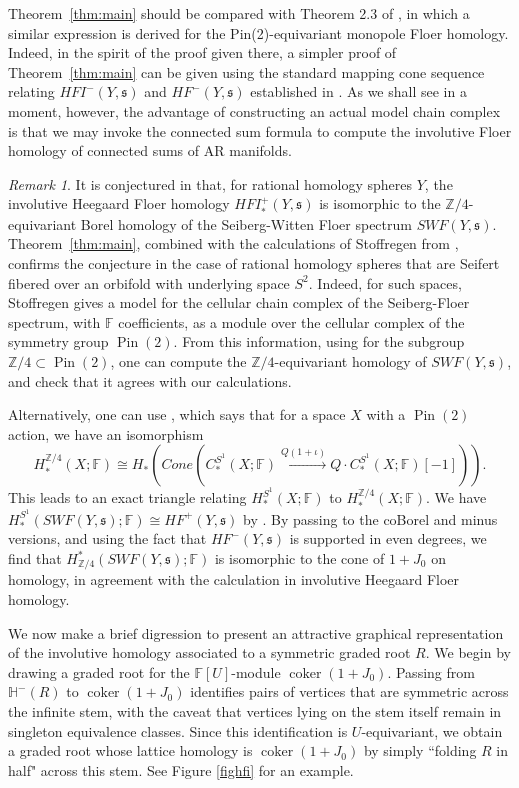 \documentclass[11 pt]{amsart}
\theoremstyle{remark}
\newtheorem {remark}[theorem]{Remark}
\DeclareMathOperator{\coker}{coker}
\newcommand\Z{\mathbb{Z}}
\def\s{\mathfrak s}
\def\ff {{\mathbb{F}}}
\def\ccdot {\! \cdot \!}
\def\pin{\operatorname{Pin}(2)}
\def\Cone{\mathit{Cone}}
\def\He{\mathbb{H}}
\def\HF {\mathit{HF}}
\newcommand \HFm {\HF^-}
\def\HFI {\mathit{HFI}}
\newcommand \HFIm {\HFI^-}
\def\inv{\iota}
\def\swf{\mathit{SWF}}
\begin{document}
Theorem~\ref{thm:main} should be compared with Theorem 2.3 of \cite{Dai}, in which a similar expression is derived for the Pin(2)-equivariant monopole Floer homology. Indeed, in the spirit of the proof given there, a simpler proof of Theorem~\ref{thm:main} can be given using the standard mapping cone sequence relating $\HFIm(Y, \s)$ and $\HFm(Y, \s)$ established in \cite[Proposition 4.6]{HMinvolutive}. As we shall see in a moment, however, the advantage of constructing an actual model chain complex is that we may invoke the connected sum formula to compute the involutive Floer homology of connected sums of AR manifolds. 

\begin{remark}
It is conjectured in \cite[Conjecture 3.2]{HMinvolutive} that, for rational homology spheres $Y$, the involutive Heegaard Floer homology $\HFI^+_*(Y, \s)$ is isomorphic to the $\Z/4$-equivariant Borel homology of the Seiberg-Witten Floer spectrum $\mathit{SWF}(Y, \s)$. Theorem~\ref{thm:main}, combined with the calculations of Stoffregen from \cite{Stoffregen}, confirms the conjecture in the case of rational homology spheres that are Seifert fibered over an orbifold with underlying space $S^2$. Indeed, for such spaces, Stoffregen gives a model for the cellular chain complex of the Seiberg-Floer spectrum, with $\ff$ coefficients, as a module over the cellular complex of the symmetry group $\pin$. From this information, using \cite[Equation (8)]{Stoffregen} for the subgroup $\Z/4 \subset \pin$, one can compute the $\Z/4$-equivariant homology of $\mathit{SWF}(Y, \s)$, and check that it agrees with our calculations. 

Alternatively, one can use \cite[Proposition 3.1]{HMinvolutive}, which says that for a space $X$ with a $\pin$ action, we have an isomorphism
$$ H_*^{\Z/4}(X; \ff) \cong H_*(\Cone(C_*^{S^1}(X; \ff) \xrightarrow{Q (1+\inv) } Q \ccdot C_*^{S^1}(X; \ff)[-1])).$$
This leads to an exact triangle relating $H_*^{S^1}(X; \ff)$ to $H_*^{\Z/4}(X; \ff)$. We have $H_*^{S^1}(\swf(Y, \s); \ff) \cong \HF^+(Y, \s)$ by \cite{LidmanManolescu}. By passing to the coBorel and minus versions, and using the fact that $\HF^-(Y, \s)$ is supported in even degrees, we find that $H^*_{\Z/4}(\swf(Y, \s); \ff)$ is isomorphic to the cone of $1+J_0$ on homology, in agreement with the calculation in involutive Heegaard Floer homology. 
\end{remark}

We now make a brief digression to present an attractive graphical representation of the involutive homology associated to a symmetric graded root $R$. We begin by drawing a graded root for the $\ff[U]$-module $\coker (1 + J_0)$. Passing from $\He^-(R)$ to $\coker (1 + J_0)$ identifies pairs of vertices that are symmetric across the infinite stem, with the caveat that vertices lying on the stem itself remain in singleton equivalence classes. Since this identification is $U$-equivariant, we obtain a graded root whose lattice homology is $\coker (1 + J_0)$ by simply ``folding $R$ in half" across this stem. See Figure \ref{fighfi} for an example. 
\end{document}
